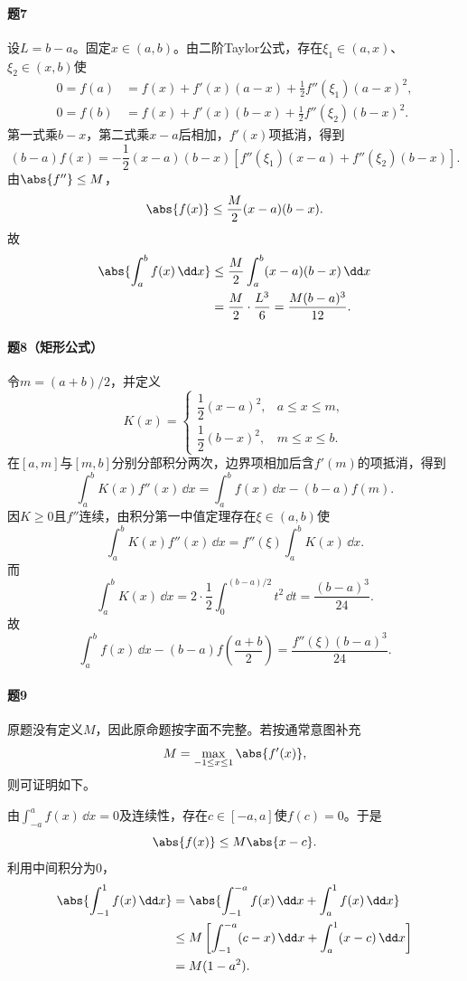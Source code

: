 \paragraph{题7}
\begin{xsolution}
设$L=b-a$。固定$x\in(a,b)$。由二阶Taylor公式，存在$\xi_1\in(a,x)$、$\xi_2\in(x,b)$使
\begin{align*}
0=f(a)&=f(x)+f'(x)(a-x)+\frac12f''(\xi_1)(a-x)^2,\\
0=f(b)&=f(x)+f'(x)(b-x)+\frac12f''(\xi_2)(b-x)^2.
\end{align*}
第一式乘$b-x$，第二式乘$x-a$后相加，$f'(x)$项抵消，得到
\[
 (b-a)f(x)
 =-\frac12(x-a)(b-x)
 \left[f''(\xi_1)(x-a)+f''(\xi_2)(b-x)\right].
\]
由$\abs{f''}\le M$，
\[
 \abs{f(x)}\le\frac M2(x-a)(b-x).
\]
故
\begin{align*}
\abs{\int_a^bf(x)\,\dd x}
&\le\frac M2\int_a^b(x-a)(b-x)\,\dd x\\
&=\frac M2\cdot\frac{L^3}{6}
=\frac{M(b-a)^3}{12}.
\end{align*}
\end{xsolution}

\paragraph{题8（矩形公式）}
\begin{xsolution}
令$m=(a+b)/2$，并定义
\[
 K(x)=
 \begin{cases}
 \dfrac12(x-a)^2,&a\le x\le m,\\[4pt]
 \dfrac12(b-x)^2,&m\le x\le b.
 \end{cases}
\]
在$[a,m]$与$[m,b]$分别分部积分两次，边界项相加后含$f'(m)$的项抵消，得到
\[
 \int_a^bK(x)f''(x)\,\dd x
 =\int_a^bf(x)\,\dd x-(b-a)f(m).
\]
因$K\ge0$且$f''$连续，由积分第一中值定理存在$\xi\in(a,b)$使
\[
 \int_a^bK(x)f''(x)\,\dd x
 =f''(\xi)\int_a^bK(x)\,\dd x.
\]
而
\[
 \int_a^bK(x)\,\dd x
 =2\cdot\frac12\int_0^{(b-a)/2}t^2\,\dd t
 =\frac{(b-a)^3}{24}.
\]
故
\[
 \int_a^bf(x)\,\dd x-(b-a)f\left(\frac{a+b}{2}\right)
 =\frac{f''(\xi)(b-a)^3}{24}.
\]
\end{xsolution}

\paragraph{题9}
\begin{xsolution}
原题没有定义$M$，因此原命题按字面不完整。若按通常意图补充
\[
 M=\max_{-1\le x\le1}\abs{f'(x)},
\]
则可证明如下。

由$\int_{-a}^af(x)\,\dd x=0$及连续性，存在$c\in[-a,a]$使$f(c)=0$。于是
\[
 \abs{f(x)}\le M\abs{x-c}.
\]
利用中间积分为0，
\begin{align*}
\abs{\int_{-1}^1f(x)\,\dd x}
&=\abs{\int_{-1}^{-a}f(x)\,\dd x+\int_a^1f(x)\,\dd x}\\
&\le M\left[
\int_{-1}^{-a}(c-x)\,\dd x+\int_a^1(x-c)\,\dd x
\right]\\
&=M(1-a^2).
\end{align*}
\end{xsolution}

